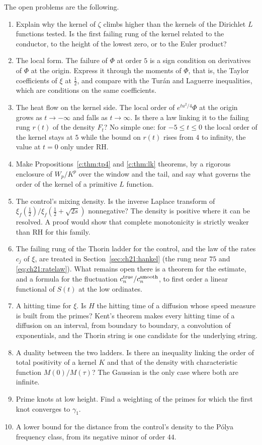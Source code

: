 The open problems are the following.
\begin{enumerate}
\item Explain why the kernel of $\zeta$ climbs higher than the kernels of the Dirichlet $L$ functions tested. Is the first failing rung of the kernel related to the conductor, to the height of the lowest zero, or to the Euler product?
\item The local form. The failure of $\Phi$ at order $5$ is a sign condition on derivatives of $\Phi$ at the origin. Express it through the moments of $\Phi$, that is, the Taylor coefficients of $\xi$ at $\frac12$, and compare with the Tur\'an and Laguerre inequalities, which are conditions on the same coefficients.
\item The heat flow on the kernel side. The local order of $e^{tu^2/4}\Phi$ at the origin grows as $t\to-\infty$ and falls as $t\to\infty$. Is there a law linking it to the failing rung $r(t)$ of the density $F_t$? No simple one: for $-5\le t\le0$ the local order of the kernel stays at $5$ while the bound on $r(t)$ rises from $4$ to infinity, the value at $t=0$ only under RH.
\item Make Propositions~\ref{c:thm:tp4} and \ref{c:thm:lk} theorems, by a rigorous enclosure of $W_p/K^p$ over the window and the tail, and say what governs the order of the kernel of a primitive $L$ function.
\item The control's mixing density. Is the inverse Laplace transform of $\xi_f(\frac12)/\xi_f(\frac12+\sqrt{2s})$ nonnegative? The density is positive where it can be resolved. A proof would show that complete monotonicity is strictly weaker than RH for this family.
\item The failing rung of the Thorin ladder for the control, and the law of the rates $c_j$ of $\xi$, are treated in Section~\ref{sec:ch21:hankel} (the rung near $75$ and \eqref{eq:ch21:ratelaw}). What remains open there is a theorem for the estimate, and a formula for the fluctuation $c_n^{\rm true}/c_n^{\rm smooth}$, to first order a linear functional of $S(t)$ at the low ordinates.
\item A hitting time for $\xi$. Is $H$ the hitting time of a diffusion whose speed measure is built from the primes? Kent's theorem \cite{Kent80} makes every hitting time of a diffusion on an interval, from boundary to boundary, a convolution of exponentials, and the Thorin string is one candidate for the underlying string.
\item A duality between the two ladders. Is there an inequality linking the order of total positivity of a kernel $K$ and that of the density with characteristic function $M(0)/M(\tau)$? The Gaussian is the only case where both are infinite.
\item Prime knots at low height. Find a weighting of the primes for which the first knot converges to $\gamma_1$.
\item A lower bound for the distance from the control's density to the P\'olya frequency class, from its negative minor of order $44$.
\end{enumerate}
